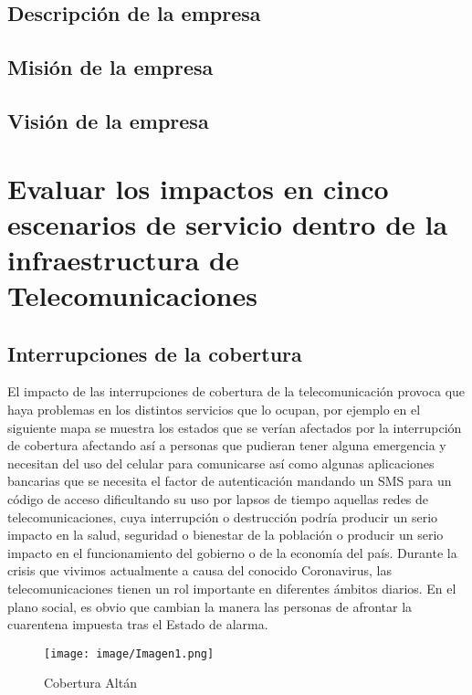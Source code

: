 \documentclass[conference]{IEEEtran}
\begin{document}
\subsection{Descripción de la empresa}

\subsection{Misión de la empresa}

\subsection{Visión de la empresa}

\section{Evaluar los impactos en cinco escenarios de servicio dentro de la infraestructura de Telecomunicaciones}
\subsection{Interrupciones de la cobertura}
El impacto de las interrupciones de cobertura de la telecomunicación provoca que haya problemas en los distintos servicios que lo ocupan, por ejemplo en el siguiente mapa se muestra los estados que se verían afectados por la interrupción de cobertura afectando así a personas que pudieran tener alguna emergencia y necesitan del uso del celular para comunicarse así como algunas aplicaciones bancarias que se necesita el factor de autenticación mandando un SMS para un código de acceso dificultando su uso por lapsos de tiempo aquellas redes de telecomunicaciones, cuya interrupción o destrucción podría producir un serio impacto en la salud, seguridad o bienestar de la población o producir un serio impacto en el funcionamiento del gobierno o de la economía del país.
Durante la crisis que vivimos actualmente a causa del conocido Coronavirus, las telecomunicaciones tienen un rol importante en diferentes ámbitos diarios.
En el plano social, es obvio que cambian la manera las personas de afrontar la cuarentena impuesta tras el Estado de alarma.
\begin{figure}[htbp]
    \begin{center}
    \texttt{[image: image/Imagen1.png]}
    \caption{Cobertura Altán}
\label{fig1}
    \end{center}
\end{figure} 
\end{document}
